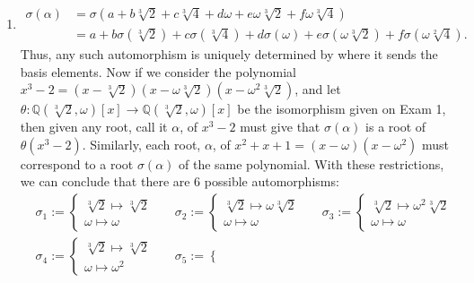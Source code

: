 \documentclass[12pt]{article}
\makeatletter
\theoremstyle{definition}
\theoremstyle{remark}
\newenvironment{solution}[1][\bf{\textit{Solution}}]{\par
  
  \normalfont \topsep6\p@\@plus6\p@\relax
  \list{}{\leftmargin=0mm
          \rightmargin=4mm
          \settowidth{\itemindent}{\itshape#1}%
          \labelwidth=\itemindent
          \parsep=0pt \listparindent=\parindent 
  }
  \item[\hskip\labelsep
        \itshape
    #1\@addpunct{.}]\ignorespaces
}{%
  \popQED\endlist\@endpefalse
}
\makeatother
\begin{document}
\begin{enumerate}[leftmargin=*]
\begin{solution}
                    \begin{equation*}
                        \begin{split}
                            \sigma(\alpha) &= \sigma(a+b\sqrt[3]{2}+c\sqrt[3]{4}+d\omega+e\omega\sqrt[3]{2}+f\omega\sqrt[3]{4})\\
                            &=a+b\sigma(\sqrt[3]{2})+c\sigma(\sqrt[3]{4})+d\sigma(\omega)+e\sigma(\omega\sqrt[3]{2})+f\sigma(\omega\sqrt[2]{4}).
                        \end{split}
                    \end{equation*}
                Thus, any such automorphism is uniquely determined by where it sends the basis elements. Now if we consider the polynomial $x^3-2=(x-\sqrt[3]{2})(x-\omega\sqrt[3]{2})(x-\omega^2\sqrt[3]{2})$, and let $\theta\colon \mathbb{Q}(\sqrt[3]{2},\omega)[x]\rightarrow\mathbb{Q}(\sqrt[3]{2},\omega)[x]$ be the isomorphism given on Exam 1, then given any root, call it $\alpha$, of $x^3-2$ must give that $\sigma(\alpha)$ is a root of $\theta(x^3-2)$. Similarly, each root, $\alpha$, of $x^2+x+1=(x-\omega)(x-\omega^2)$ must correspond to a root $\sigma(\alpha)$ of the same polynomial. With these restrictions, we can conclude that there are 6 possible automorphisms:
                    \begin{align*}
                        &\sigma_1:=\begin{cases} 
                            \sqrt[3]{2}\mapsto\sqrt[3]{2}\\
                            \omega\mapsto\omega
                        \end{cases} && \sigma_2:=\begin{cases} 
                            \sqrt[3]{2}\mapsto\omega\sqrt[3]{2}\\
                            \omega\mapsto\omega
                        \end{cases} && \sigma_3:=\begin{cases} 
                            \sqrt[3]{2}\mapsto\omega^2\sqrt[3]{2}\\
                            \omega\mapsto\omega
                        \end{cases} \\
                        &\sigma_4:=\begin{cases} 
                            \sqrt[3]{2}\mapsto\sqrt[3]{2}\\
                            \omega\mapsto\omega^2
                        \end{cases} && \sigma_5:=\begin{cases} 

\end{cases}
\end{align*}
\end{solution}
\end{enumerate}
\end{document}
